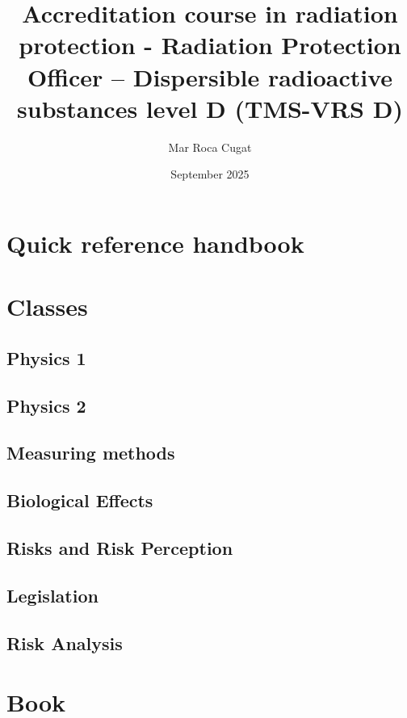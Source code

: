 \documentclass{report}
\title{Accreditation course in radiation protection - Radiation Protection Officer – Dispersible radioactive substances level D (TMS-VRS D)}
\date{September 2025}
\author{Mar Roca Cugat}
\begin{document}
\maketitle
\tableofcontents
\part{Quick reference handbook}

\setcounter{page}{1}\part{Classes}
\chapter{Physics 1}
\chapter{Physics 2}
\chapter{Measuring methods}
\chapter{Biological Effects}
\chapter{Risks and Risk Perception}
\chapter{Legislation}
\chapter{Risk Analysis}
\setcounter{page}{1}\part{Book}
\end{document}
